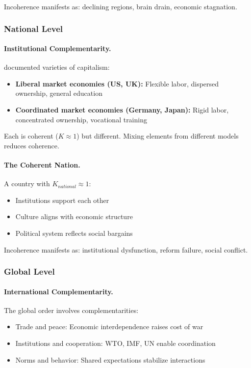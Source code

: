 \documentclass[12pt,a4paper]{article}
\begin{document}
Incoherence manifests as: declining regions, brain drain, economic stagnation.

\subsubsection{National Level}

\paragraph{Institutional Complementarity.}
\citet{hallsoskice2001} documented varieties of capitalism:
\begin{itemize}
  \item \textbf{Liberal market economies (US, UK):} Flexible labor, dispersed ownership, general education
  \item \textbf{Coordinated market economies (Germany, Japan):} Rigid labor, concentrated ownership, vocational training
\end{itemize}

Each is coherent ($K \approx 1$) but different.
Mixing elements from different models reduces coherence.

\paragraph{The Coherent Nation.}
A country with $K_{national} \approx 1$:
\begin{itemize}
  \item Institutions support each other
  \item Culture aligns with economic structure
  \item Political system reflects social bargains
\end{itemize}

Incoherence manifests as: institutional dysfunction, reform failure, social conflict.

\subsubsection{Global Level}

\paragraph{International Complementarity.}
The global order involves complementarities:
\begin{itemize}
  \item Trade and peace: Economic interdependence raises cost of war
  \item Institutions and cooperation: WTO, IMF, UN enable coordination
  \item Norms and behavior: Shared expectations stabilize interactions
\end{itemize}
\end{document}
